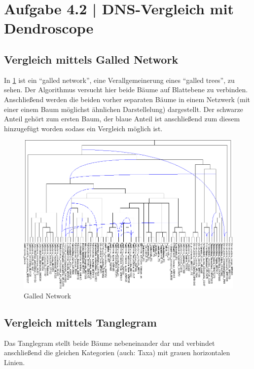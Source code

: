 \documentclass[a4paper,12pt,ngerman]{scrartcl}
\begin{document}
\newpage

\section{Aufgabe 4.2 | DNS-Vergleich mit Dendroscope}
\subsection*{Vergleich mittels Galled Network}

In \cref{fig:galledNetwork} ist ein \enquote{galled network}, eine Verallgemeinerung eines \enquote{galled trees}, zu sehen. Der Algorithmus versucht hier beide Bäume auf Blattebene zu verbinden. Anschließend werden die beiden vorher separaten Bäume in einem Netzwerk (mit einer einem Baum möglichst ähnlichen Darstellelung) dargestellt. Der schwarze Anteil gehört zum ersten Baum, der blaue Anteil ist anschließend zum diesem hinzugefügt worden sodass ein Vergleich möglich ist.

\begin{figure}[ht]
    \centering
    \includegraphics[width=\textwidth]{includes/GalledNetwork}
    \caption{Galled Network}
    \label{fig:galledNetwork}
\end{figure}

\subsection*{Vergleich mittels Tanglegram}

Das Tanglegram stellt beide Bäume nebeneinander dar und verbindet anschließend die gleichen Kategorien (auch: Taxa) mit grauen horizontalen Linien.
\end{document}
